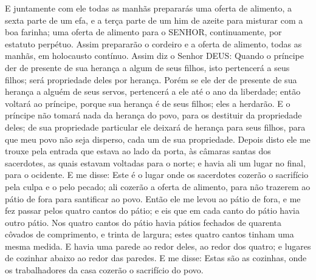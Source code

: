 {E juntamente com ele todas as manhãs prepararás uma oferta de alimento, a sexta parte de um efa, e a terça parte de um him de azeite para misturar com a boa farinha;
{} uma oferta de alimento para o SENHOR, continuamente, por estatuto perpétuo.
Assim prepararão o cordeiro e a oferta de alimento, todas as manhãs, em holocausto contínuo.
Assim diz o Senhor DEUS: Quando o príncipe der de presente
{} de sua herança a algum de seus filhos, isto pertencerá a seus filhos; será propriedade deles por herança.
Porém se ele der de presente
{} de sua herança a alguém de seus servos, pertencerá a ele até o ano da liberdade;
 então voltará ao príncipe, porque sua herança é de seus filhos; eles a herdarão.
E o príncipe não tomará nada da herança do povo, para os destituir da propriedade deles; de sua propriedade particular ele deixará de herança para seus filhos, para que meu povo não seja disperso, cada um de sua propriedade.
Depois disto ele me trouxe pela entrada que estava ao lado da porta, às câmaras santas dos sacerdotes, as quais estavam voltadas para o norte; e havia ali um lugar no final, para o ocidente.
E me disse: Este é o lugar onde os sacerdotes cozerão o sacrifício pela culpa e o pelo pecado; ali cozerão a oferta de alimento, para não
{} trazerem ao pátio de fora para santificar ao povo.
Então ele me levou ao pátio de fora, e me fez passar pelos quatro cantos do pátio; e eis que em cada canto do pátio havia outro pátio.
Nos quatro cantos do pátio havia
{} pátios fechados
 de quarenta côvados de comprimento, e trinta de largura; estes quatro cantos tinham uma mesma medida.
E havia uma parede ao redor deles, ao redor dos quatro; e lugares de cozinhar abaixo ao redor das paredes.
E me disse: Estas são as cozinhas, onde os trabalhadores da casa cozerão o sacrifício do povo.

}
